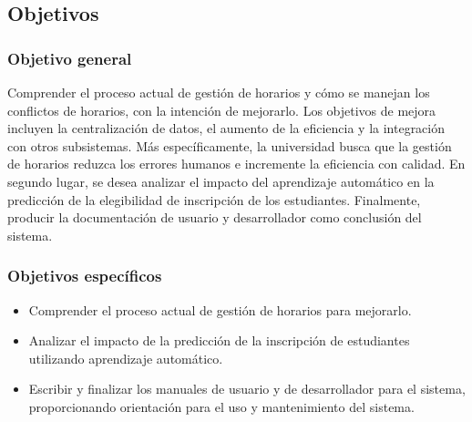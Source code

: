 \subsection{Objetivos}

\subsubsection{Objetivo general}

Comprender el proceso actual de gestión de horarios y cómo se manejan los conflictos de horarios, con la intención de mejorarlo.
Los objetivos de mejora incluyen la centralización de datos, el aumento de la eficiencia y la integración con otros subsistemas. Más específicamente, la universidad busca que la gestión de horarios reduzca los errores humanos e incremente la eficiencia con calidad.
En segundo lugar, se desea analizar el impacto del aprendizaje automático en la predicción de la elegibilidad de inscripción de los estudiantes.
Finalmente, producir la documentación de usuario y desarrollador como conclusión del sistema.

\subsubsection{Objetivos específicos}

\begin{itemize}
    \item Comprender el proceso actual de gestión de horarios para mejorarlo.
    \item Analizar el impacto de la predicción de la inscripción de estudiantes utilizando aprendizaje automático.
	\item Escribir y finalizar los manuales de usuario y de desarrollador para el sistema, proporcionando orientación para el uso y mantenimiento del sistema.
\end{itemize}

